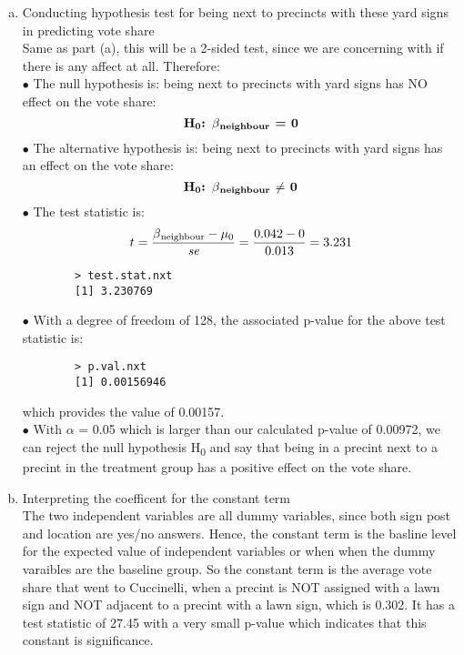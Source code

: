 \documentclass[12pt,letterpaper]{article}
\begin{document}
\begin{enumerate} [(a)]
		\item Conducting hypothesis test for being next to precincts with these yard signs in predicting vote share \\
		Same as part (a), this will be a 2-sided test, since we are concerning with if there is any affect at all. Therefore: \\
		$\bullet$ The null hypothesis is: being next to precincts with yard signs has NO effect on the vote share:
		$${\textbf{H\textsubscript{0}: $\beta$\textsubscript{neighbour} = 0}}$$
		$\bullet$ The alternative hypothesis is: being next to precincts with yard signs has an effect on the vote share:
		$${\textbf{H\textsubscript{0}: $\beta$\textsubscript{neighbour} $\neq$ 0}}$$
		$\bullet$ The test statistic is:
		$${t = \frac{\beta\textsubscript{neighbour}	 - \mu\textsubscript{0}}{\textit{se}}} = \frac{0.042 - 0}{0.013} = 3.231 $$
		
		\begin{verbatim}
		> test.stat.nxt
		[1] 3.230769
		\end{verbatim}
		$\bullet$ With a degree of freedom of 128, the associated p-value for the above test statistic is:
		
		\begin{verbatim}
		> p.val.nxt
		[1] 0.00156946
		\end{verbatim}
		which provides the value of 0.00157. \\
		$\bullet$ With $\alpha$ = 0.05 which is larger than our calculated p-value of 0.00972, we can reject the null hypothesis H\textsubscript{0} and say that being in a precint next to a precint in the treatment group has a positive effect on the vote share.
		
		\item Interpreting the coefficent for the constant term \\
		The two independent variables are all dummy variables, since both sign post and location are yes/no answers. Hence, the constant term is the basline level for the expected value of independent variables or when when the dummy varaibles are the baseline group. So the constant term is the average vote share that went to Cuccinelli, when a precint is NOT assigned with a lawn sign and NOT adjacent to a precint with a lawn sign, which is 0.302. It has a test statistic of 27.45 with a very small p-value which indicates that this constant is significance.
		

\end{enumerate}
\end{document}
